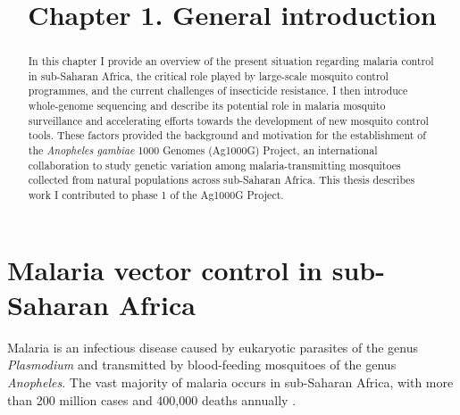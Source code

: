 \documentclass[a4paper,11pt,abstracton,hidelinks]{scrartcl}
\title{
Chapter 1. General introduction
}
\author{}
\begin{document}
\renewcommand{\abstractname}{Summary}


\maketitle


\begin{abstract}


In this chapter I provide an overview of the present situation regarding malaria control in sub-Saharan Africa, the critical role played by large-scale mosquito control programmes, and the current challenges of insecticide resistance.
%
I then introduce whole-genome sequencing and describe its potential role in malaria mosquito surveillance and accelerating efforts towards the development of new mosquito control tools.
%
These factors provided the background and motivation for the establishment of the \textit{Anopheles gambiae} 1000 Genomes (Ag1000G) Project, an international collaboration to study genetic variation among malaria-transmitting mosquitoes collected from natural populations across sub-Saharan Africa.
%
This thesis describes work I contributed to phase 1 of the Ag1000G Project.
%


\end{abstract}


\section{Malaria vector control in sub-Saharan Africa}


Malaria is an infectious disease caused by eukaryotic parasites of the genus \textit{Plasmodium} and transmitted by blood-feeding mosquitoes of the genus \textit{Anopheles}.
%
The vast majority of malaria occurs in sub-Saharan Africa, with more than 200 million cases and 400,000 deaths annually \citep{WHO2019WMR}.
\end{document}
